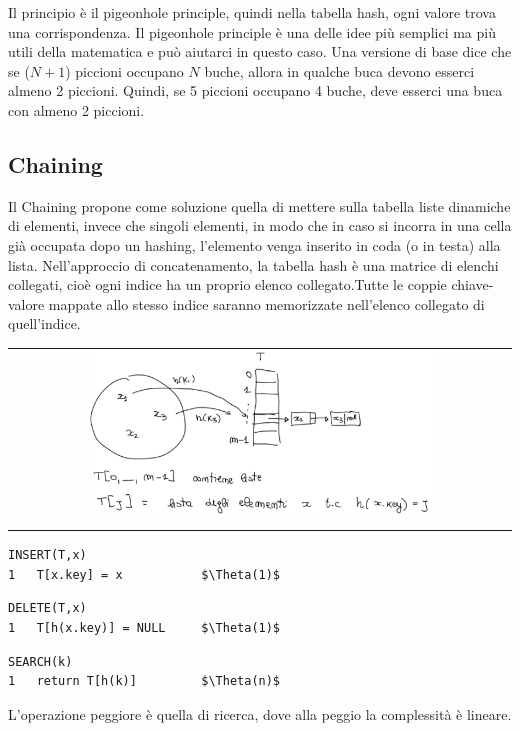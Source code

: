 Il principio è il pigeonhole principle, quindi nella tabella hash, ogni valore trova una corrispondenza. 
Il pigeonhole principle è una delle idee più semplici ma più utili della matematica e può aiutarci in questo caso. 
Una versione di base dice che se ($N+1$) piccioni occupano $N$ buche, allora in qualche buca devono esserci almeno 2 piccioni. 
Quindi, se 5 piccioni occupano 4 buche, deve esserci una buca con almeno 2 piccioni.

\subsection{Chaining}
Il Chaining propone come soluzione quella di mettere sulla tabella liste dinamiche di elementi, invece che singoli elementi, in modo che in caso si incorra in una cella già occupata dopo un hashing, l'elemento venga inserito in coda (o in testa) alla lista. Nell'approccio di concatenamento, la tabella hash è una matrice di elenchi collegati, cioè ogni indice ha un proprio elenco collegato.Tutte le coppie chiave-valore mappate allo stesso indice saranno memorizzate nell'elenco collegato di quell'indice.

\begin{center}
    \begin{tabular}{c}
        \\ \includegraphics[width=0.7\textwidth]{image/Chaining.png} \\ \\
    \end{tabular}
\end{center}

\newpage
\begin{mdframed}
\begin{lstlisting}[mathescape=true]
INSERT(T,x)
1   T[x.key] = x           $\Theta(1)$
\end{lstlisting}
\end{mdframed}
\begin{mdframed}
\begin{lstlisting}[mathescape=true]
DELETE(T,x)
1   T[h(x.key)] = NULL     $\Theta(1)$
\end{lstlisting}
\end{mdframed}
\begin{mdframed}
\begin{lstlisting}[mathescape=true]
SEARCH(k)
1   return T[h(k)]         $\Theta(n)$
\end{lstlisting}
\end{mdframed}
L'operazione peggiore è quella di ricerca, dove alla peggio la complessità è lineare.

